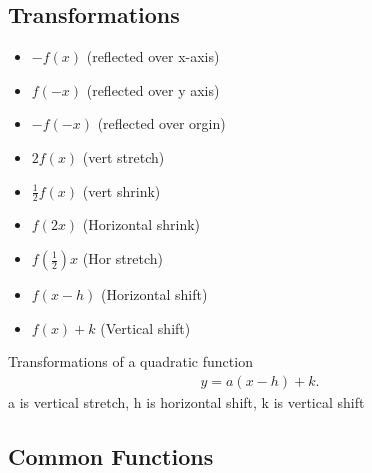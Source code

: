 \documentclass{report}
\begin{document}
    
      \bigbreak \noindent \bigbreak \noindent 
      \subsection{Transformations}
      \begin{itemize}
        \item  $-f(x)$ (reflected over x-axis)
        \item $f(-x)$ (reflected over y axis)
        \item $-f(-x)$ (reflected over orgin)
        \item $2f(x)$ (vert stretch)
        \item $\frac{1}{2}f(x)$ (vert shrink)
        \item $f(2x)$ (Horizontal shrink)
        \item $f(\frac{1}{2})x$ (Hor stretch)
        \item $f(x-h)$ (Horizontal shift)
        \item $f(x) +k$ (Vertical shift)
      \end{itemize}
      \bigbreak \noindent \bigbreak \noindent
      Transformations of a quadratic function
      \begin{align*}
        y = a(x-h) +k
      .\end{align*}
      \bigbreak \noindent \bigbreak \noindent
      a is vertical stretch, h is horizontal shift, k is vertical shift

    
    \pagebreak \bigbreak \noindent
    \subsection{Common Functions}
    \begin{figure}[ht]
        \centering
        \label{fig:xsquared}
        \label{fig:xcubed}
    \end{figure}

    \begin{figure}[ht]
        \centering
        \label{fig:sqrtx}
        \label{fig:cubrootx}
    \end{figure}


    \begin{figure}[ht]
        \centering
        \label{fig:1overx}
    \end{figure}

    \begin{figure}[ht]
      \centering
        \label{fig:absx}
    \end{figure}
\end{document}
